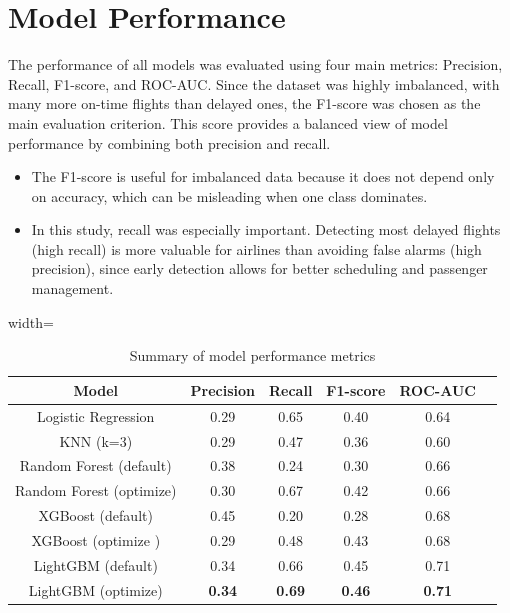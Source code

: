 \documentclass[a4paper,12pt]{report}
\begin{document}
\section{Model Performance}

The performance of all models was evaluated using four main metrics: Precision, Recall, F1-score, and ROC-AUC. Since the dataset was highly imbalanced, with many more on-time flights than delayed ones, the F1-score was chosen as the main evaluation criterion. This score provides a balanced view of model performance by combining both precision and recall.
\begin{itemize}
    \item The F1-score is useful for imbalanced data because it does not depend only on accuracy, which can be misleading when one class dominates.
    \item In this study, recall was especially important. Detecting most delayed flights (high recall) is more valuable for airlines than avoiding false alarms (high precision), since early detection allows for better scheduling and passenger management.
\end{itemize}

\begin{table}[H]
\centering
\begin{adjustbox}{width=\textwidth}
\begin{tabular}{|c|c|c|c|c|c|}
\hline
\textbf{Model}  & \textbf{Precision} & \textbf{Recall} & \textbf{F1-score} & \textbf{ROC-AUC} \\
\hline
Logistic Regression & 0.29 & 0.65 & 0.40 & 0.64 \\
KNN (k=3) & 0.29 & 0.47 & 0.36 & 0.60 \\
Random Forest (default) & 0.38 & 0.24 & 0.30 & 0.66 \\
Random Forest (optimize) & 0.30 & 0.67 & 0.42 & 0.66 \\
XGBoost (default) & 0.45 & 0.20 & 0.28 & 0.68 \\
XGBoost (optimize )& 0.29 & 0.48 & 0.43 & 0.68 \\
LightGBM (default) & 0.34 & 0.66 & 0.45 & 0.71 \\
LightGBM (optimize) & \textbf{0.34} & \textbf{0.69} & \textbf{0.46} & \textbf{0.71} \\
\hline
\end{tabular}
\end{adjustbox}
\caption{Summary of model performance metrics}
\label{tab:model_performance}
\end{table}
\end{document}

